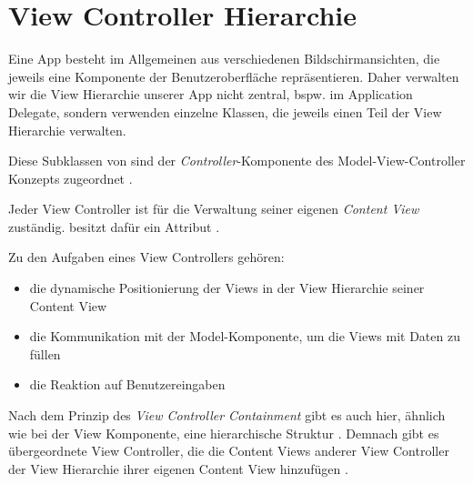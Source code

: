 \documentclass[parskip=half, final]{scrreprt}
\begin{document}
%
%


\section{View Controller Hierarchie}\label{sec:vchierarchy}

\mvcindicatorcontroller

Eine App besteht im Allgemeinen aus verschiedenen Bildschirmansichten, die jeweils eine Komponente der Benutzeroberfläche repräsentieren. Daher verwalten wir die View Hierarchie unserer App nicht zentral, bspw. im Application Delegate, sondern verwenden einzelne Klassen, die jeweils einen Teil der View Hierarchie verwalten.

Diese Subklassen von  sind der \emph{Controller}-Komponente des Model-View-Controller Konzepts zugeordnet .

Jeder View Controller ist für die Verwaltung seiner eigenen \emph{Content View} zuständig.  besitzt dafür ein Attribut .

Zu den Aufgaben eines View Controllers gehören:
\begin{itemize}
\item die dynamische Positionierung der Views in der View Hierarchie seiner Content View
\item die Kommunikation mit der Model-Komponente, um die Views mit Daten zu füllen
\item die Reaktion auf Benutzereingaben
\end{itemize}

Nach dem Prinzip des \emph{View Controller Containment} gibt es auch hier, ähnlich wie bei der View Komponente, eine hierarchische Struktur . Demnach gibt es übergeordnete View Controller, die die Content Views anderer View Controller der View Hierarchie ihrer eigenen Content View hinzufügen .

\clearpage
{}
\end{document}

